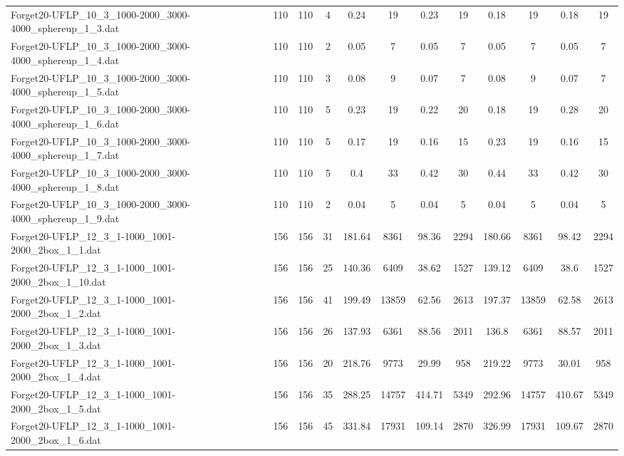 \begin{sidewaystable}[!ht]
{\begin{tabular}{lccccccccccc}
Forget20-UFLP\_10\_3\_1000-2000\_3000-4000\_sphereup\_1\_3.dat & 110 & 110 & 4 & 0.24 & 19 & 0.23 & 19 &  \textcolor{blue2}{0.18} & 19 &  \textcolor{blue2}{0.18} & 19 \\
Forget20-UFLP\_10\_3\_1000-2000\_3000-4000\_sphereup\_1\_4.dat & 110 & 110 & 2 &  \textcolor{blue2}{0.05} & 7 &  \textcolor{blue2}{0.05} & 7 &  \textcolor{blue2}{0.05} & 7 &  \textcolor{blue2}{0.05} & 7 \\
Forget20-UFLP\_10\_3\_1000-2000\_3000-4000\_sphereup\_1\_5.dat & 110 & 110 & 3 & 0.08 & 9 &  \textcolor{blue2}{0.07} & 7 & 0.08 & 9 &  \textcolor{blue2}{0.07} & 7 \\
Forget20-UFLP\_10\_3\_1000-2000\_3000-4000\_sphereup\_1\_6.dat & 110 & 110 & 5 & 0.23 & 19 & 0.22 & 20 &  \textcolor{blue2}{0.18} & 19 & 0.28 & 20 \\
Forget20-UFLP\_10\_3\_1000-2000\_3000-4000\_sphereup\_1\_7.dat & 110 & 110 & 5 & 0.17 & 19 &  \textcolor{blue2}{0.16} & 15 & 0.23 & 19 &  \textcolor{blue2}{0.16} & 15 \\
Forget20-UFLP\_10\_3\_1000-2000\_3000-4000\_sphereup\_1\_8.dat & 110 & 110 & 5 & 0.4 & 33 & 0.42 & 30 & 0.44 & 33 & 0.42 & 30 \\
Forget20-UFLP\_10\_3\_1000-2000\_3000-4000\_sphereup\_1\_9.dat & 110 & 110 & 2 &  \textcolor{blue2}{0.04} & 5 &  \textcolor{blue2}{0.04} & 5 &  \textcolor{blue2}{0.04} & 5 &  \textcolor{blue2}{0.04} & 5 \\
Forget20-UFLP\_12\_3\_1-1000\_1001-2000\_2box\_1\_1.dat & 156 & 156 & 31 & 181.64 & 8361 & 98.36 & 2294 & 180.66 & 8361 & 98.42 & 2294 \\
Forget20-UFLP\_12\_3\_1-1000\_1001-2000\_2box\_1\_10.dat & 156 & 156 & 25 & 140.36 & 6409 & 38.62 & 1527 & 139.12 & 6409 & 38.6 & 1527 \\
Forget20-UFLP\_12\_3\_1-1000\_1001-2000\_2box\_1\_2.dat & 156 & 156 & 41 & 199.49 & 13859 & 62.56 & 2613 & 197.37 & 13859 & 62.58 & 2613 \\
Forget20-UFLP\_12\_3\_1-1000\_1001-2000\_2box\_1\_3.dat & 156 & 156 & 26 & 137.93 & 6361 &  \textcolor{blue2}{88.56} & 2011 & 136.8 & 6361 & 88.57 & 2011 \\
Forget20-UFLP\_12\_3\_1-1000\_1001-2000\_2box\_1\_4.dat & 156 & 156 & 20 & 218.76 & 9773 & 29.99 & 958 & 219.22 & 9773 & 30.01 & 958 \\
Forget20-UFLP\_12\_3\_1-1000\_1001-2000\_2box\_1\_5.dat & 156 & 156 & 35 & 288.25 & 14757 & 414.71 & 5349 & 292.96 & 14757 & 410.67 & 5349 \\
Forget20-UFLP\_12\_3\_1-1000\_1001-2000\_2box\_1\_6.dat & 156 & 156 & 45 & 331.84 & 17931 & 109.14 & 2870 & 326.99 & 17931 & 109.67 & 2870 \\

\end{tabular}}
\end{sidewaystable}
